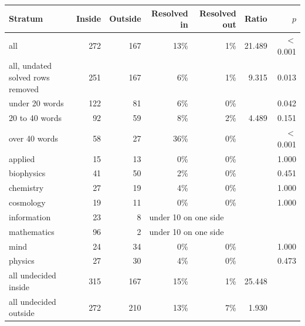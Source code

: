 \begin{tabular}{@{}lrrrrrr@{}}
\toprule
Stratum & Inside & Outside & Resolved in & Resolved out & Ratio & $p$ \\
\midrule
all & 272 & 167 & 13\% & 1\% & 21.489 & $<$0.001 \\
all, undated solved rows removed & 251 & 167 & 6\% & 1\% & 9.315 & 0.013 \\
under 20 words & 122 & 81 & 6\% & 0\% &  & 0.042 \\
20 to 40 words & 92 & 59 & 8\% & 2\% & 4.489 & 0.151 \\
over 40 words & 58 & 27 & 36\% & 0\% &  & $<$0.001 \\
applied & 15 & 13 & 0\% & 0\% &  & 1.000 \\
biophysics & 41 & 50 & 2\% & 0\% &  & 0.451 \\
chemistry & 27 & 19 & 4\% & 0\% &  & 1.000 \\
cosmology & 19 & 11 & 0\% & 0\% &  & 1.000 \\
information & 23 & 8 & \multicolumn{4}{l}{under 10 on one side} \\
mathematics & 96 & 2 & \multicolumn{4}{l}{under 10 on one side} \\
mind & 24 & 34 & 0\% & 0\% &  & 1.000 \\
physics & 27 & 30 & 4\% & 0\% &  & 0.473 \\
\midrule
all undecided inside & 315 & 167 & 15\% & 1\% & 25.448 & \\
all undecided outside & 272 & 210 & 13\% & 7\% & 1.930 & \\
\bottomrule
\end{tabular}

